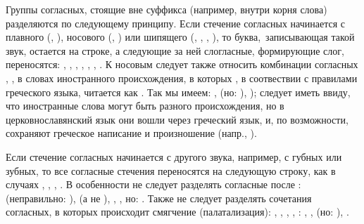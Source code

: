 \documentclass[12pt,a4paper,oneside]{extarticle}
\begin{document}
Группы согласных, стоящие вне суффикса (например, внутри корня слова) разделяются по следующему принципу. Если стечение согласных начинается с плавного (, ), носового (, ) или шипящего (, , , ), то буква, записывающая такой звук, остается на строке, а следующие за ней слогласные, формирующие слог, переносятся: , , , , , , . К носовым следует также относить комбинации согласных , ,  в словах иностранного происхождения, в которых , в соотвествии с правилами греческого языка, читается как . Так мы имеем: ,  (но: ), ); следует иметь ввиду, что иностранные слова могут быть разного происхождения, но в церковнославянский язык они вошли через греческий язык, и, по возможности, сохраняют греческое написание и произношение (напр., ).

Если стечение согласных начинается с другого звука, например, с губных или зубных, то все согласные стечения переносятся на следующую строку, как в случаях , , , . В особенности не следует разделять согласные после :  (неправильно: ),  (а не ), , , но: . Также не следует разделять сочетания согласных, в которых происходит смягчение (палатализация): , , , , : , ,  (но: ), .
\end{document}
